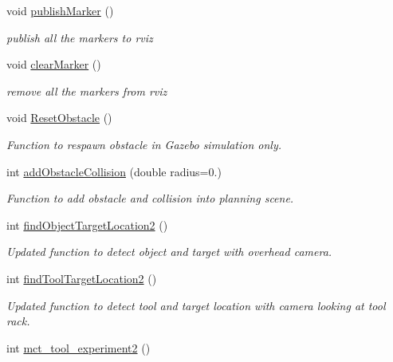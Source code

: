 \begin{DoxyCompactItemize}
void \hyperlink{structManipulate_a71a59840948b21a66265da53b09bf94d}{publish\+Marker} ()
\begin{DoxyCompactList}\small\item\em publish all the markers to rviz \end{DoxyCompactList}\item 
\mbox{\label{structManipulate_a292ee17af26baa74c5e91cdb94f217e9}} 
void \hyperlink{structManipulate_a292ee17af26baa74c5e91cdb94f217e9}{clear\+Marker} ()
\begin{DoxyCompactList}\small\item\em remove all the markers from rviz \end{DoxyCompactList}\item 
\mbox{\label{structManipulate_a64ee2e12c6bc8d8a092802666f7064d3}} 
void \hyperlink{structManipulate_a64ee2e12c6bc8d8a092802666f7064d3}{Reset\+Obstacle} ()
\begin{DoxyCompactList}\small\item\em Function to respawn obstacle in Gazebo simulation only. \end{DoxyCompactList}\item 
int \hyperlink{structManipulate_ad8cb006920541e0c78775571f62c8ce1}{add\+Obstacle\+Collision} (double radius=0.)
\begin{DoxyCompactList}\small\item\em Function to add obstacle and collision into planning scene. \end{DoxyCompactList}\item 
int \hyperlink{structManipulate_a1ccca6fcd1ad2ac9d48a112cbb90fdf9}{find\+Object\+Target\+Location2} ()
\begin{DoxyCompactList}\small\item\em Updated function to detect object and target with overhead camera. \end{DoxyCompactList}\item 
int \hyperlink{structManipulate_a9f8d8093a4a0d0adf0a00148673f5781}{find\+Tool\+Target\+Location2} ()
\begin{DoxyCompactList}\small\item\em Updated function to detect tool and target location with camera looking at tool rack. \end{DoxyCompactList}\item 
int \hyperlink{structManipulate_ad42c5cd9aaae7a12c0056fe4d78fcbf8}{mct\+\_\+tool\+\_\+experiment2} ()

\end{DoxyCompactItemize}
